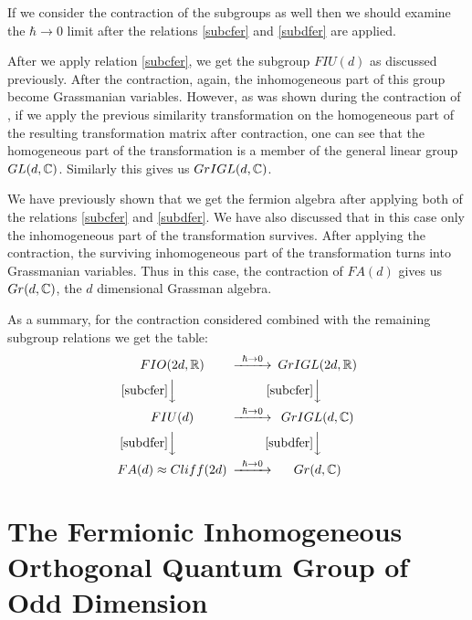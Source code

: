 If we consider the contraction of the subgroups as well then we
should examine the $\hbar \rightarrow 0$ limit after the relations
\eqref{subcfer} and \eqref{subdfer} are applied.

After we apply relation \eqref{subcfer}, we get the subgroup $FIU(d)$
as discussed previously. After the contraction,
again, the inhomogeneous part of this group become
Grassmanian variables. However, as was shown during the contraction
of \BISp, if we apply the previous similarity
transformation on the homogeneous part of the resulting transformation
matrix after contraction, one can see that the
homogeneous part of the transformation is a member of the general
linear group $GL(d, \mathbb{C})$. Similarly this gives us $GrIGL(d, \mathbb{C})$.

We have previously shown that we get the fermion
algebra after applying both of the relations \eqref{subcfer} and
\eqref{subdfer}. We have also discussed that in this case only the
inhomogeneous part of the transformation survives. After
applying the contraction, the surviving inhomogeneous part of the
transformation turns into Grassmanian variables. Thus
in this case, the contraction of $FA(d)$ gives us $Gr(d, \mathbb{C})$,
the $d$ dimensional Grassman algebra.

As a summary, for the contraction considered combined with the
remaining subgroup relations we get the table:
\[
\begin{CD}
{FIO(2d, \IR)}            @> \hbar \rightarrow 0   >> {GrIGL(2d, \IR)} \\
@V\eqref{subcfer}VV                                    @V\eqref{subcfer}VV \\
{FIU(d)}                  @> \hbar \rightarrow 0   >> {GrIGL(d, \IC)} \\
@V\eqref{subdfer}VV                                    @V\eqref{subdfer}VV \\
{FA(d) \approx Cliff(2d)} @> \hbar \rightarrow 0    >> {Gr(d, \IC)}
\end{CD}
\]

\section{The Fermionic Inhomogeneous
Orthogonal Quantum Group of Odd Dimension}

